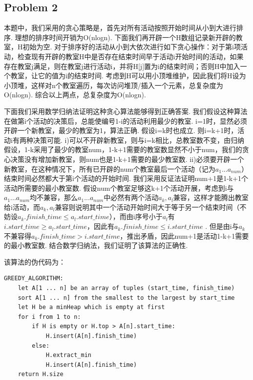 \documentclass[UTF8]{ctexart}
\begin{document}
\subsection*{Problem 2}
本题中，我们采用的贪心策略是，首先对所有活动按照开始时间从小到大进行排序. 理想的排序时间开销为O(nlogn). 下面我们再开辟一个H数组记录新开辟的教室，H初始为空. 对于排序好的活动从小到大依次进行如下贪心操作：对于第i项活动，检查现有开辟的教室H中是否存在结束时间早于活动i开始时间的活动，如果存在教室j满足，则在教室j进行活动i，并将H[j]置为i的结束时间；否则H中加入一个教室，让它的值为i的结束时间. 考虑到H可以用小顶堆维护，因此我们将H设为小顶堆，这样对n个教室遍历，每次访问堆顶/插入一个元素，总复杂度为O(nlogn). 综合以上两点，总复杂度为O(nlogn).\par
下面我们采用数学归纳法证明这种贪心算法能够得到正确答案. 我们假设这种算法在做第i个活动的决策后，总能使编号1-i的活动利用最少的教室. i=1时，显然必须开辟一个新教室，最少的教室为1，算法正确. 假设i=k时也成立. 则i=k+1时，活动i有两种决策可能. i)可以不开辟新教室，则与i=k相比，总教室数不变，由归纳假设，1-k采用了最少的教室num，1-k+1需要的教室数显然不小于num，我们的贪心决策没有增加新教室，则num也是1-k+1需要的最少教室数. ii)必须要开辟一个新教室，在这种情况下，所有已开辟的num个教室最后一个活动（记为$a_1 ... a_{num}$）结束时间必然都大于第i个活动的开始时间. 我们采用反证法证明num+1是1-k+1个活动所需要的最小教室数. 假设num个教室足够这k+1个活动开展，考虑到i与$a_1 ... a_{num}$均不兼容，那么$a_1 ... a_{num}$中必然有两个活动$a_k, a_l$兼容，这样才能腾出教室给i活动，而$a_k, a_l$兼容则说明其中一个活动开始时间大于等于另一个结束时间（不妨设$a_k.finish\_time\leq a_l.start\_time$），而由i序号小于$a_l$有$i.start\_time \geq a_l.start\_time$，因此有$a_k.finish\_time \leq i.start\_time$
. 但是由i与$a_k$不兼容得$a_k.finish\_time > i.start\_time$，推出矛盾，因此num+1是活动1-k+1需要的最小教室数. 结合数学归纳法，我们证明了该算法的正确性.\par

该算法的伪代码为：
\begin{lstlisting}
GREEDY_ALGORITHM:
	let A[1 ... n] be an array of tuples (start_time, finish_time)
	sort A[1 ... n] from the smallest to the largest by start_time 
	let H be a minHeap which is empty at first
	for i from 1 to n:
		if H is empty or H.top > A[n].start_time:
			H.insert(A[n].finish_time)
		else:
			H.extract_min
			H.insert(A[n].finish_time)
	return H.size
\end{lstlisting}
\end{document}
